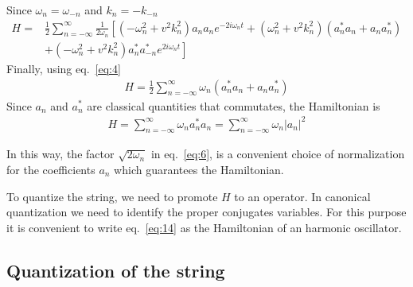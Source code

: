 Since $\omega_n=\omega_{-n}$ and $k_n=-k_{-n}$
\begin{align}
 H =  &\frac12
\sum_{n=-\infty}^\infty \frac{1}{2\omega_n}
  \left[(- \omega_n^2+v^2 k_n^2)a_n a_n e^{-2i\omega_n t}
+( \omega_n^2+v^2 k_n^2)(a_n^*a_n+a_n a_n^*)\right.\nonumber\\
&+\left.(- \omega_n^2+v^2 k_n^2)a_n^*a_{-n}^*e^{2i\omega_n t}\right]
\end{align}
Finally, using eq.~\eqref{eq:4}
\begin{align}
\label{eq:13}
  H=\frac{1}{2}\sum_{n=-\infty}^\infty\omega_n(a_n^*a_n+a_n a_n^*)
\end{align}
Since $a_n$ and $a_n^*$ are classical quantities that commutates, the Hamiltonian is
\begin{align}
  \label{eq:14}
  H=\sum_{n=-\infty}^\infty\omega_na_n^*a_n=\sum_{n=-\infty}^\infty\omega_n|a_n|^2
\end{align}

In this way, the factor $\sqrt{2\omega_{n}}$ in eq.~\eqref{eq:6}, is a convenient choice of normalization for the coefficients $a_n$ which guarantees the Hamiltonian.

To quantize the string, we need to promote $H$ to an operator. In canonical quantization we need to identify the proper conjugates variables. For this purpose it is convenient to write eq.~\eqref{eq:14} as the Hamiltonian of an harmonic oscillator.

\subsection{Quantization of the string}
\label{sec:quantization-string}


